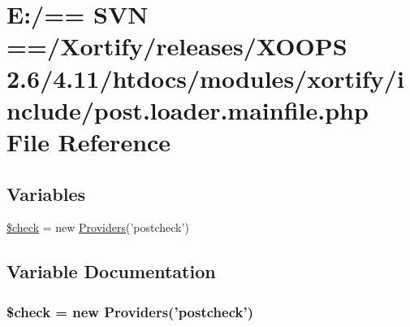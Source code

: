 \hypertarget{post_8loader_8mainfile_8php}{\section{E\-:/== S\-V\-N ==/\-Xortify/releases/\-X\-O\-O\-P\-S 2.6/4.11/htdocs/modules/xortify/include/post.loader.\-mainfile.\-php File Reference}
\label{post_8loader_8mainfile_8php}
}
\subsection*{Variables}
\begin{DoxyCompactItemize}
\item 
\hyperlink{post_8loader_8mainfile_8php_a830cf70d25fefacddcf4c6bc3fd7a0e0}{\$check} = new \hyperlink{class_providers}{Providers}('postcheck')
\end{DoxyCompactItemize}


\subsection{Variable Documentation}
\hypertarget{post_8loader_8mainfile_8php_a830cf70d25fefacddcf4c6bc3fd7a0e0}{
\subsubsection[{\$check}]{\setlength{\rightskip}{0pt plus 5cm}\$check = new {\bf Providers}('postcheck')}}\label{post_8loader_8mainfile_8php_a830cf70d25fefacddcf4c6bc3fd7a0e0}
